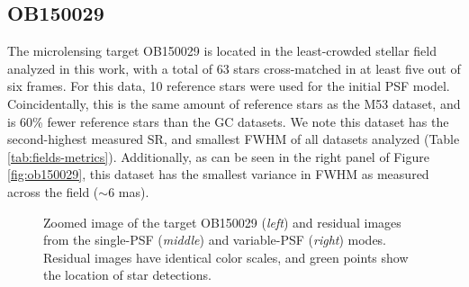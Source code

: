 \documentclass[]{spie}  %
\begin{document}
\subsection{OB150029} \label{sec:results-ob150029}

\indent The microlensing target OB150029 is located in the least-crowded stellar field analyzed in this work, with a total of 63 stars cross-matched in at least five out of six frames. For this data, 10 reference stars were used for the initial PSF model. Coincidentally, this is the same amount of reference stars as the M53 dataset, and is 60\% fewer reference stars than the GC datasets. We note this dataset has the second-highest measured SR, and smallest FWHM of all datasets analyzed (Table \ref{tab:fields-metrics}). Additionally, as can be seen in the right panel of Figure \ref{fig:ob150029}, this dataset has the smallest variance in FWHM as measured across the field (${\sim}6$ mas). 
\\
\begin{figure}[!h]
 \caption{\footnotesize Zoomed image of the target OB150029 (\textit{left}) and residual images from the single-PSF (\textit{middle}) and variable-PSF (\textit{right}) modes. Residual images have identical color scales, and green points show the location of star detections.} \label{fig:ob150029-targ-res}
\end{figure}
\end{document}
